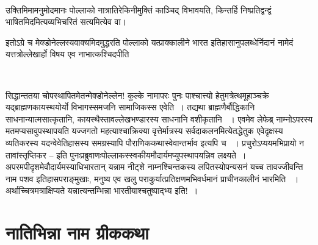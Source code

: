 \begin{myquote}

~\hfill {}
\end{myquote}

\newpage

उक्तिमिमामनुमोदमानः पोल्लाको नात्रातिरेकिनीमुक्तिं काञ्चिद् विभावयति, किन्तर्हि निष्प्रतिद्वन्द्वं भाषितमिदमित्यव्यभिचरितं सत्यमित्येव वा।

इतोऽग्रे च मेक्डोनेल्लस्यवाक्यमिदमुद्धरति पोल्लाको यत्प्राक्कालीने भारत इतिहासानुपलब्धेर्निदानं नामेदं यत्तत्रोल्लेखार्हो विषय एव नाभात्कश्चिदपीति

\begin{myquote}

~\hfill {}
\end{myquote}

सिद्धान्ततया चोपस्थापितमेतन्मेक्डोनेल्लेन! कुल्के  नामापरः पुनः पाश्चात्त्यो हेतुमत्रेत्थमूहाञ्चक्रे यद्ब्राह्मणकायस्थयोर्यो विभागस्समजनि सामाजिकस्स एवेति~। तद्यथा ब्राह्मणैर्बौद्धिकानि साधनान्यात्मसात्कृतानि, कायस्थैस्तावल्लेखभण्डारस्य  साधनानि वशीकृतानि ~। एवमेव लेफेब्र्  नाम्नोऽपरस्य मतमप्यसावुपस्थापयति यज्जगतो महत्याश्चाक्रिक्या वृत्तेर्मात्रस्य सर्वदाकलनमित्येतद्धेतुक एवेदृक्षस्य व्यतिकरस्य यदन्वेवेतिहासस्य समग्रस्यापि पौराणिककथास्वेवान्तर्भाव इत्यपि च ~। प्रचुरोऽप्ययमभिप्रायो न तावांस्तृप्तिकर – इति पुनःप्रब्रुवाणःपोल्लाकस्स्वकीयमौदार्यमप्युपस्थापयन्निव लक्ष्यते~। अपरमपीदृशमेवौदार्यमस्याधिभारतान् यन्नाम नीट्शे नाम्नश्चिन्तकस्य लपितस्योपन्यसनं यच्च तावज्जीवन्ति नाम पशव इतिहासपराङ्मुखाः, मनुष्य एव खलु पराकुर्यात्प्रतिक्षणमभिवर्धमानं प्राचीनकालीनं भारमिति ~। अर्थाच्चित्रमत्राक्षिप्यते यन्नात्यन्तम्भिन्ना भारतीयाश्चतुष्पाद्भ्य इति!~।

\section*{नातिभिन्ना नाम ग्रीककथा}

